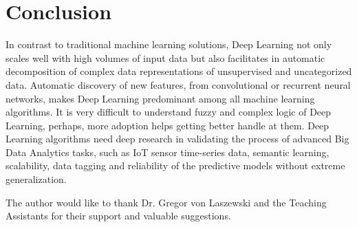 \documentclass[sigconf]{acmart}
\begin{document}
	\section{Conclusion}		

	In contrast to traditional machine learning solutions, Deep Learning not only scales well with high volumes of input data but also facilitates in automatic decomposition of complex data representations of unsupervised and uncategorized data. Automatic discovery of new features, from convolutional or recurrent neural networks, makes Deep Learning predominant among all machine learning algorithms. It is very difficult to understand fuzzy and complex logic of Deep Learning, perhaps, more adoption helps getting better handle at them. Deep Learning algorithms need deep research in validating the process of advanced Big Data Analytics tasks, such as IoT sensor time-series data, semantic learning, scalability, data tagging and reliability of the predictive models without extreme generalization.  
	
	
	\begin{acks}		
	
		The author would like to thank Dr. Gregor von Laszewski and the Teaching Assistants for their support and valuable suggestions.
		
	\end{acks}

	
	 
	

	
\end{document}
